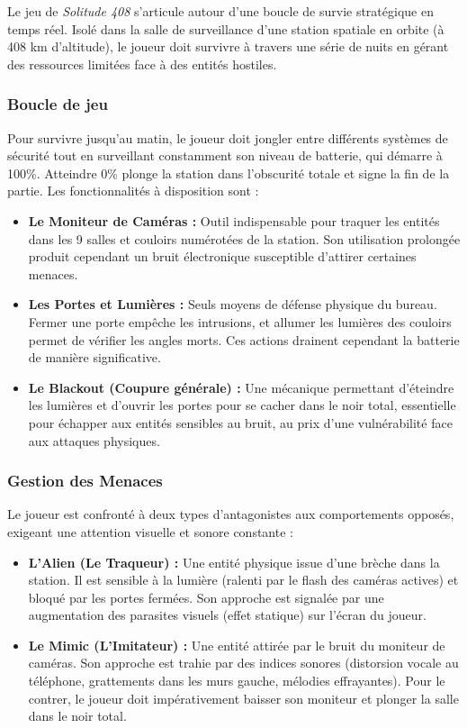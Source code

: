 \documentclass[11pt, a4paper]{article}
\begin{document}
    Le jeu de \textit{Solitude 408} s'articule autour d'une boucle de survie stratégique en temps réel. Isolé dans la salle de surveillance d'une station spatiale en orbite (à 408 km d'altitude), le joueur doit survivre à travers une série de nuits en gérant des ressources limitées face à  des entités hostiles.

    \subsubsection{Boucle de jeu}
    Pour survivre jusqu'au matin, le joueur doit jongler entre différents systèmes de sécurité tout en surveillant constamment son niveau de batterie, qui démarre à 100\%. Atteindre 0\% plonge la station dans l'obscurité totale et signe la fin de la partie. Les fonctionnalités à disposition sont :
    \begin{itemize}
        \item \textbf{Le Moniteur de Caméras :} Outil indispensable pour traquer les entités dans les 9 salles et couloirs numérotées de la station. Son utilisation prolongée produit cependant un bruit électronique susceptible d'attirer certaines menaces.
        \item \textbf{Les Portes et Lumières :} Seuls moyens de défense physique du bureau. Fermer une porte empêche les intrusions, et allumer les lumières des couloirs permet de vérifier les angles morts. Ces actions drainent cependant la batterie de manière significative.
        \item \textbf{Le Blackout (Coupure générale) :} Une mécanique permettant d'éteindre les lumières et d'ouvrir les portes pour se cacher dans le noir total, essentielle pour échapper aux entités sensibles au bruit, au prix d'une vulnérabilité face aux attaques physiques.
    \end{itemize}

    \subsubsection{Gestion des Menaces}
    Le joueur est confronté à deux types d'antagonistes aux comportements opposés, exigeant une attention visuelle et sonore constante :
    \begin{itemize}
        \item \textbf{L'Alien (Le Traqueur) :} Une entité physique issue d'une brèche dans la station. Il est sensible à la lumière (ralenti par le flash des caméras actives) et bloqué par les portes fermées. Son approche est signalée par une augmentation des parasites visuels (effet statique) sur l'écran du joueur.
        \item \textbf{Le Mimic (L'Imitateur) :} Une entité attirée par le bruit du moniteur de caméras. Son approche est trahie par des indices sonores (distorsion vocale au téléphone, grattements dans les murs gauche, mélodies effrayantes). Pour le contrer, le joueur doit impérativement baisser son moniteur et plonger la salle dans le noir total.
    \end{itemize}
\end{document}
